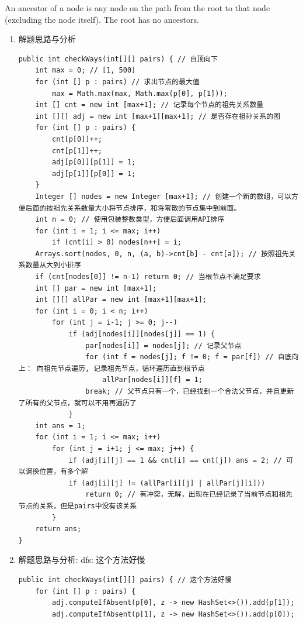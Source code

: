 \documentclass[9pt, b5paaper]{book}
\begin{document}
An ancestor of a node is any node on the path from the root to that node (excluding the node itself). The root has no ancestors.
\begin{enumerate}
\item 解题思路与分析
\label{sec-3-0-2-1}
\begin{verbatim}
public int checkWays(int[][] pairs) { // 自顶向下
    int max = 0; // [1, 500]
    for (int [] p : pairs) // 求出节点的最大值
        max = Math.max(max, Math.max(p[0], p[1]));
    int [] cnt = new int [max+1]; // 记录每个节点的祖先关系数量
    int [][] adj = new int [max+1][max+1]; // 是否存在祖孙关系的图
    for (int [] p : pairs) {
        cnt[p[0]]++;
        cnt[p[1]]++;
        adj[p[0]][p[1]] = 1;
        adj[p[1]][p[0]] = 1;
    }
    Integer [] nodes = new Integer [max+1]; // 创建一个新的数组，可以方便后面的按祖先关系数量大小将节点排序，和将零散的节点集中到前面。
    int n = 0; // 使用包装整数类型，方便后面调用API排序
    for (int i = 1; i <= max; i++) 
        if (cnt[i] > 0) nodes[n++] = i;
    Arrays.sort(nodes, 0, n, (a, b)->cnt[b] - cnt[a]); // 按照祖先关系数量从大到小排序
    if (cnt[nodes[0]] != n-1) return 0; // 当根节点不满足要求
    int [] par = new int [max+1];
    int [][] allPar = new int [max+1][max+1];
    for (int i = 0; i < n; i++) 
        for (int j = i-1; j >= 0; j--) 
            if (adj[nodes[i]][nodes[j]] == 1) {
                par[nodes[i]] = nodes[j]; // 记录父节点
                for (int f = nodes[j]; f != 0; f = par[f]) // 自底向上： 向祖先节点遍历, 记录祖先节点，循环遍历直到根节点
                    allPar[nodes[i]][f] = 1;
                break; // 父节点只有一个，已经找到一个合法父节点，并且更新了所有的父节点，就可以不用再遍历了
            }
    int ans = 1;
    for (int i = 1; i <= max; i++)
        for (int j = i+1; j <= max; j++) {
            if (adj[i][j] == 1 && cnt[i] == cnt[j]) ans = 2; // 可以调换位置，有多个解
            if (adj[i][j] != (allPar[i][j] | allPar[j][i]))
                return 0; // 有冲突，无解，出现在已经记录了当前节点和祖先节点的关系，但是pairs中没有该关系
        }
    return ans;
}
\end{verbatim}
\item 解题思路与分析: dfs: 这个方法好慢
\label{sec-3-0-2-2}
\begin{verbatim}
public int checkWays(int[][] pairs) { // 这个方法好慢
    for (int [] p : pairs) {
        adj.computeIfAbsent(p[0], z -> new HashSet<>()).add(p[1]);
        adj.computeIfAbsent(p[1], z -> new HashSet<>()).add(p[0]);

\end{verbatim}
\end{enumerate}
\end{document}
